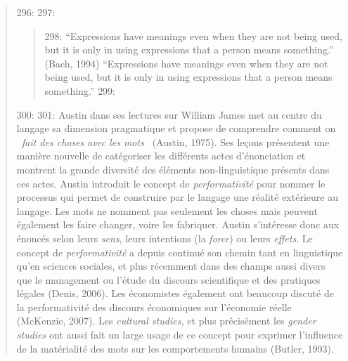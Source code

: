 \begin{quote}
296: 
297: \begin{quote}
298: {\textquotedblleft}Expressions have meanings even when they are not being used, but it is only in using expressions that a person means something.{\textquotedblright} (Bach, 1994)
{\textquotedblleft}Expressions have meanings even when they are not being used, but it is only in using expressions that a person means something.{\textquotedblright} \cite{Bach1994}
299: \end{quote}
300: 
301: Austin dans ses lectures sur William James met au centre du langage sa dimension pragmatique et propose de comprendre comment on \textit{{\guillemotleft}~fait des choses avec les mots~{\guillemotright}} (Austin, 1975). Ses le\c{c}ons pr\'esentent une mani\`ere nouvelle de cat\'egoriser les diff\'erents actes d{\textquoteright}\'enonciation et montrent la grande diversit\'e des \'el\'ements non-linguistique pr\'esents dans ces actes. Austin introduit le concept de \textit{performativit\'e }pour nommer le processus qui permet de construire par le langage une r\'ealit\'e ext\'erieure au langage. Les mots ne nomment pas seulement les choses mais peuvent \'egalement les faire changer, voire les fabriquer. Austin s{\textquoteright}int\'eresse donc aux \'enonc\'es selon leurs \textit{sens}, leurs intentions (la \textit{force}) ou leurs \textit{effets}. Le concept de \textit{performativit\'e }a depuis continu\'e son chemin tant en linguistique qu{\textquoteright}en sciences sociales, et plus r\'ecemment dans des champs aussi divers que le management ou l{\textquoteright}\'etude du discours scientifique et des pratiques l\'egales (Denis, 2006). Les \'economistes \'egalement ont beaucoup discut\'e de la performativit\'e des discours \'economiques sur l{\textquoteright}\'economie r\'eelle (McKenzie, 2007). Les \textit{cultural studies,} et plus pr\'ecis\'ement les \textit{gender studies }ont aussi fait un large usage de ce concept pour exprimer l{\textquoteright}influence de la mat\'erialit\'e des mots sur les comportements humains (Butler, 1993).  

\end{quote}
